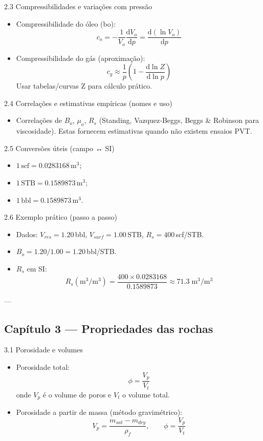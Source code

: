 \documentclass[11pt,a4paper]{article}
\begin{document}
2.3 Compressibilidades e variações com pressão
\begin{itemize}
\item Compressibilidade do óleo (bo):
$$c_o = -\dfrac{1}{V_o}\dfrac{\mathrm{d}V_o}{\mathrm{d}p} = \dfrac{\mathrm{d}(\ln V_o)}{\mathrm{d}p}$$
\item Compressibilidade do gás (aproximação):
$$c_g \approx \dfrac{1}{p} \left(1 - \dfrac{\mathrm{d}\ln Z}{\mathrm{d}\ln p}\right)$$
Usar tabelas/curvas Z para cálculo prático.
\end{itemize}

2.4 Correlações e estimativas empíricas (nomes e uso)
\begin{itemize}
\item Correlações de $B_o$, $\mu_o$, $R_s$ (Standing, Vazquez‑Beggs, Beggs & Robinson para viscosidade). Estas fornecem estimativas quando não existem ensaios PVT.
\end{itemize}

2.5 Conversões úteis (campo ↔ SI)
\begin{itemize}
\item $1\,\text{scf}=0.0283168\,\text{m}^3$;
\item $1\,\text{STB}=0.1589873\,\text{m}^3$;
\item $1\,\text{bbl}=0.1589873\,\text{m}^3$.
\end{itemize}

2.6 Exemplo prático (passo a passo)
\begin{itemize}
\item Dados: $V_{res}=1.20\,$bbl, $V_{surf}=1.00\,$STB, $R_s=400\,$scf/STB.
\item $B_o = 1.20/1.00 = 1.20\,$bbl/STB.
\item $R_s$ em SI:
$$R_s(\text{m}^3/\text{m}^3)=\dfrac{400\times0.0283168}{0.1589873}\approx71.3\;\text{m}^3/\text{m}^3$$
\end{itemize}

---

\subsection{Capítulo 3 — Propriedades das rochas}

3.1 Porosidade e volumes
\begin{itemize}
\item Porosidade total:
$$\phi=\dfrac{V_p}{V_t}$$
onde $V_p$ é o volume de poros e $V_t$ o volume total.
\item Porosidade a partir de massa (método gravimétrico):
$$V_p=\dfrac{m_{sat}-m_{dry}}{\rho_f},\qquad \phi=\dfrac{V_p}{V_t}$$
\end{itemize}
\end{document}
